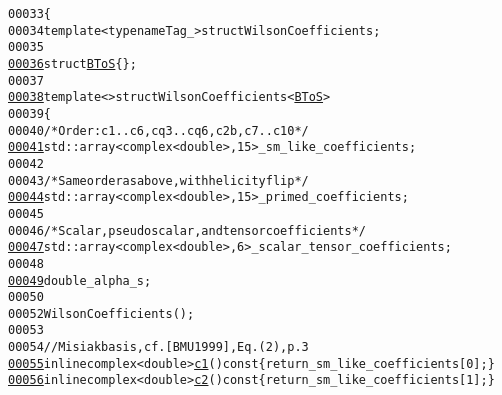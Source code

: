 \begin{footnotesize}
\begin{alltt}
00033 \{
00034     \textcolor{keyword}{template} <\textcolor{keyword}{typename} Tag\_> \textcolor{keyword}{struct }WilsonCoefficients;
00035 
\hypertarget{wilson__coefficients_8hh_source_l00036}{}\hyperlink{structeos_1_1BToS}{00036}     \textcolor{keyword}{struct }\hyperlink{structeos_1_1BToS}{BToS} \{\};
00037 
\hypertarget{wilson__coefficients_8hh_source_l00038}{}\hyperlink{structeos_1_1WilsonCoefficients_3_01BToS_01_4}{00038}     \textcolor{keyword}{template} <> \textcolor{keyword}{struct }WilsonCoefficients<\hyperlink{structeos_1_1BToS}{BToS}>
00039     \{
00040         \textcolor{comment}{/* Order: c1..c6, cq3..cq6, c2b, c7..c10 */}
\hypertarget{wilson__coefficients_8hh_source_l00041}{}\hyperlink{structeos_1_1WilsonCoefficients_3_01BToS_01_4_ad55e5edfe673a97fe71981a429cb7152}{00041}         std::array<complex<double>, 15> \_sm\_like\_coefficients;
00042 
00043         \textcolor{comment}{/* Same order as above, with helicity flip */}
\hypertarget{wilson__coefficients_8hh_source_l00044}{}\hyperlink{structeos_1_1WilsonCoefficients_3_01BToS_01_4_a4c2aa2cde65c6c77df70e6fa87736ac7}{00044}         std::array<complex<double>, 15> \_primed\_coefficients;
00045 
00046         \textcolor{comment}{/* Scalar, pseudoscalar, and tensor coefficients */}
\hypertarget{wilson__coefficients_8hh_source_l00047}{}\hyperlink{structeos_1_1WilsonCoefficients_3_01BToS_01_4_ac890d2d52439b631a8eaee283825dcc3}{00047}         std::array<complex<double>, 6> \_scalar\_tensor\_coefficients;
00048 
\hypertarget{wilson__coefficients_8hh_source_l00049}{}\hyperlink{structeos_1_1WilsonCoefficients_3_01BToS_01_4_ad988c930213682048f50ec4fa3390cc8}{00049}         \textcolor{keywordtype}{double} \_alpha\_s;
00050 
00052         WilsonCoefficients();
00053 
00054         \textcolor{comment}{// Misiak basis, cf. [BMU1999], Eq. (2), p. 3}
\hypertarget{wilson__coefficients_8hh_source_l00055}{}\hyperlink{structeos_1_1WilsonCoefficients_3_01BToS_01_4_a17759f6b63cf172d7d7f07dbbb78e3f9}{00055}         \textcolor{keyword}{inline} complex<double> \hyperlink{structeos_1_1WilsonCoefficients_3_01BToS_01_4_a17759f6b63cf172d7d7f07dbbb78e3f9}{c1}()\textcolor{keyword}{ const }\{ \textcolor{keywordflow}{return} \_sm\_like\_coefficients[0]; \}
\hypertarget{wilson__coefficients_8hh_source_l00056}{}\hyperlink{structeos_1_1WilsonCoefficients_3_01BToS_01_4_afcb665ee21ae1be28cec84c0a3781132}{00056}         \textcolor{keyword}{inline} complex<double> \hyperlink{structeos_1_1WilsonCoefficients_3_01BToS_01_4_afcb665ee21ae1be28cec84c0a3781132}{c2}()\textcolor{keyword}{ const }\{ \textcolor{keywordflow}{return} \_sm\_like\_coefficients[1]; \}

\end{alltt}
\end{footnotesize}
